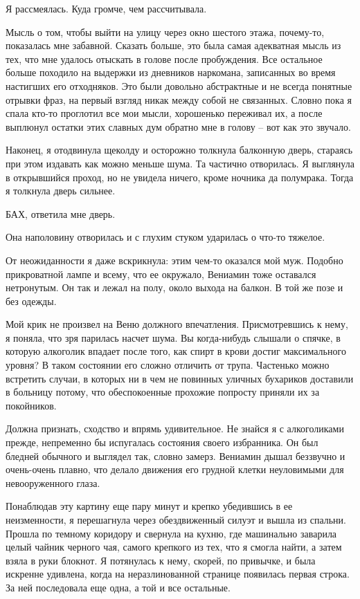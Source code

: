 \documentclass[
]{book}
\begin{document}
Я рассмеялась. Куда громче, чем рассчитывала.

Мысль о том, чтобы выйти на улицу через окно шестого этажа, почему-то, показалась мне забавной. Сказать больше, это была самая адекватная мысль из тех, что мне удалось отыскать в голове после пробуждения. Все остальное больше походило на выдержки из дневников наркомана, записанных во время настигших его отходняков. Это были довольно абстрактные и не всегда понятные отрывки фраз, на первый взгляд никак между собой не связанных. Словно пока я спала кто-то проглотил все мои мысли, хорошенько переживал их, а после выплюнул остатки этих славных дум обратно мне в голову -- вот как это звучало.

Наконец, я отодвинула щеколду и осторожно толкнула балконную дверь, стараясь при этом издавать как можно меньше шума. Та частично отворилась. Я выглянула в открывшийся проход, но не увидела ничего, кроме ночника да полумрака. Тогда я толкнула дверь сильнее.

БАХ, ответила мне дверь.

Она наполовину отворилась и с глухим стуком ударилась о что-то тяжелое.

От неожиданности я даже вскрикнула: этим чем-то оказался мой муж. Подобно прикроватной лампе и всему, что ее окружало, Вениамин тоже оставался нетронутым. Он так и лежал на полу, около выхода на балкон. В той же позе и без одежды.

Мой крик не произвел на Веню должного впечатления. Присмотревшись к нему, я поняла, что зря парилась насчет шума. Вы когда-нибудь слышали о спячке, в которую алкоголик впадает после того, как спирт в крови достиг максимального уровня? В таком состоянии его сложно отличить от трупа. Частенько можно встретить случаи, в которых ни в чем не повинных уличных бухариков доставили в больницу потому, что обеспокоенные прохожие попросту приняли их за покойников.

Должна признать, сходство и впрямь удивительное. Не знайся я с алкоголиками прежде, непременно бы испугалась состояния своего избранника. Он был бледней обычного и выглядел так, словно замерз. Вениамин дышал беззвучно и очень-очень плавно, что делало движения его грудной клетки неуловимыми для невооруженного глаза.

Понаблюдав эту картину еще пару минут и крепко убедившись в ее неизменности, я перешагнула через обездвиженный силуэт и вышла из спальни. Прошла по темному коридору и свернула на кухню, где машинально заварила целый чайник черного чая, самого крепкого из тех, что я смогла найти, а затем взяла в руки блокнот. Я потянулась к нему, скорей, по привычке, и была искренне удивлена, когда на неразлинованной странице появилась первая строка. За ней последовала еще одна, а той и все остальные.
\end{document}
